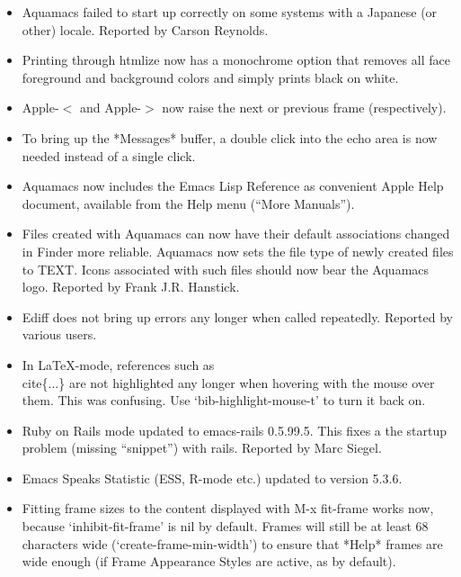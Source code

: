\begin{itemize}
	
\item Aquamacs failed to start up correctly on some systems with a
  Japanese (or other) locale.
Reported by Carson Reynolds.

\item Printing through htmlize now has a monochrome option that
  removes all face foreground and background colors and simply prints
  black on white.

\item Apple-$<$ and Apple-$>$ now raise the next or previous frame (respectively).

\item To bring up the *Messages* buffer, a double click into the echo
  area is now needed instead of a single click.

\item Aquamacs now includes the Emacs Lisp Reference as convenient
  Apple Help document, available from the Help menu (``More Manuals'').

\item Files created with Aquamacs can now have their default associations changed in Finder more reliable. Aquamacs now sets the file type of newly created files to TEXT. Icons associated with such files should now bear the Aquamacs logo.
Reported by Frank J.R. Hanstick.

\item Ediff does not bring up errors any longer when called repeatedly.
Reported by various users.

\item In LaTeX-mode, references such as \\cite\{...\} are not
  highlighted any longer when hovering with the mouse over them. This
  was confusing. Use `bib-highlight-mouse-t' to turn it back on.

\item Ruby on Rails mode updated to emacs-rails 0.5.99.5. This  fixes
  a the startup problem (missing ``snippet'') with rails.
  Reported by Marc Siegel.

\item Emacs Speaks Statistic (ESS, R-mode etc.) updated to version 5.3.6.

\item Fitting frame sizes to the content displayed with M-x fit-frame
  works now, because `inhibit-fit-frame' is nil by default. Frames
  will still be at least 68 characters wide (`create-frame-min-width')
  to ensure that *Help* frames are wide enough (if Frame Appearance
  Styles are active, as by default).


\end{itemize}
